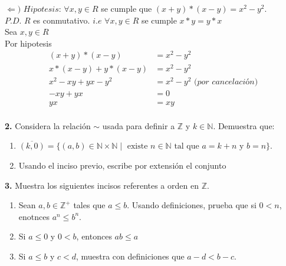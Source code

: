 \documentclass[12pt]{article}
\begin{document}
$\Longleftarrow)$ $Hipotesis$:  $\forall x, y \in R$ se cumple que $(x + y) \ast (x - y) = x^2 - y^2$.\\

$P.D$. $R$ es conmutativo. $i.e$ $\forall x, y \in R$ se cumple $x \ast y = y \ast x$\\

Sea $x, y \in R$\\

Por hipotesis
\begin{align*}
                (x + y) \ast (x - y) &= x^2 - y^2\\
                x \ast (x -y) + y \ast (x -y) &= x^2 - y^2\\
                x^2 -xy + yx -y^2 &= x^2 - y^2 \textit{ (por cancelación)}\\
                -xy + yx &= 0\\
                yx &= xy\\
              \end{align*}
\vspace{1cm}

%
%
\textbf{2.} Considera la relación $\sim$ usada para definir a $\mathbb{Z}$ y $k \in \mathbb{N}$. Demuestra que:
    \begin{enumerate}[label=\alph*)]
        \item $\overline{(k, 0)} = \{(a, b) \in \mathbb{N} \times \mathbb{N} \mid \text{ existe } n \in \mathbb{N} \text{ tal que } a = k + n \text{ y } b = n\}$.

        \item Usando el inciso previo, escribe por extensión el conjunto

    \end{enumerate}
\vspace{1cm}

%
%
\textbf{3.} Muestra los siguientes incisos referentes a orden en $\mathbb{Z}$.
    \begin{enumerate}[label=\alph*)]
        \item Sean $a, b \in \mathbb{Z}^+$ tales que $a \leq b$. Usando definiciones, prueba que si $0 < n$, enotnces $a^n \leq b^n$.

        \item Si $ a \leq 0$ y $0 < b$, entonces $ab \leq a$

        \item Si $a \leq b$ y $c < d$, muestra con definiciones que $a - d < b - c$.

    \end{enumerate}
\vspace{1cm}
\end{document}
